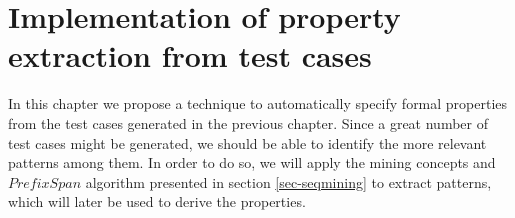 \chapter{Implementation of property extraction from test cases}
\label{cap:propextract}

In this chapter we propose a technique to automatically specify formal properties from the test cases generated in the previous chapter. Since a great number of test cases might be generated, we should be able to identify the more relevant patterns among them. In order to do so, we will apply the mining concepts and $PrefixSpan$ algorithm presented in section \ref{sec-seqmining} to extract patterns, which will later be used to derive the properties.



%


%








